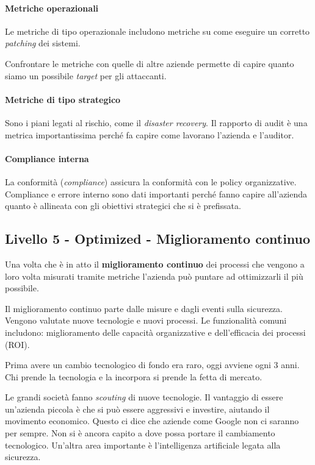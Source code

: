 \paragraph*{Metriche operazionali}

Le metriche di tipo operazionale includono metriche su come eseguire
un corretto \textit{patching} dei sistemi.

Confrontare le metriche con quelle di altre aziende permette di capire quanto
siamo un possibile \textit{target} per gli attaccanti.

\paragraph*{Metriche di tipo strategico}

Sono i piani legati al rischio, come il \textit{disaster recovery}.
Il rapporto di audit è una metrica importantissima perché fa capire come
lavorano l'azienda e l'auditor.

\paragraph*{Compliance interna}

La conformità (\textit{compliance}) assicura la conformità con le policy
organizzative. Compliance e errore interno sono dati importanti perché
fanno capire all'azienda quanto è allineata con gli obiettivi strategici che
si è prefissata.


\subsection{Livello 5 - Optimized - Miglioramento continuo}

Una volta che è in atto il \textbf{miglioramento continuo}
dei processi che vengono a loro volta misurati tramite metriche l'azienda
può puntare ad ottimizzarli il più possibile.
  
Il miglioramento continuo parte dalle misure e dagli eventi sulla sicurezza.
Vengono valutate nuove tecnologie e nuovi processi. Le funzionalità comuni
includono: miglioramento delle capacità organizzative e dell'efficacia dei
processi (ROI).

Prima avere un cambio tecnologico di fondo era raro, oggi avviene ogni 3 anni.
Chi prende la tecnologia e la incorpora si prende la fetta di mercato.

Le grandi società fanno \textit{scouting} di nuove tecnologie. Il vantaggio di
essere un'azienda piccola è che si può essere aggressivi e investire, aiutando
il movimento economico. Questo ci dice che aziende come Google non ci
saranno per sempre. Non si è ancora capito a dove possa portare il cambiamento
tecnologico. Un'altra area importante è l'intelligenza artificiale legata
alla sicurezza.

